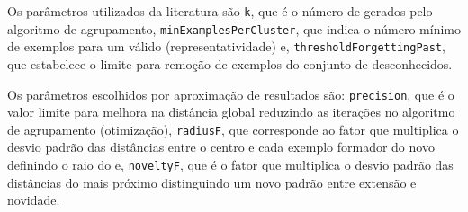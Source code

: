 Os parâmetros utilizados da literatura são
\texttt{k}, que é o número de \mclusters gerados pelo algoritmo de agrupamento,
\texttt{minExamplesPerCluster}, que indica o número mínimo de exemplos para um
\mcluster válido (representatividade) e,
\texttt{thresholdForgettingPast}, que estabelece o limite para remoção de exemplos do conjunto de
desconhecidos.

Os parâmetros escolhidos por aproximação de resultados são:
\texttt{precision}, que é o valor limite para melhora na distância global reduzindo as 
iterações no algoritmo de agrupamento (otimização),
\texttt{radiusF}, que corresponde ao fator que multiplica o desvio padrão das distâncias entre o
centro e cada exemplo formador do novo \mcluster definindo o raio do \mcluster
e,
\texttt{noveltyF}, que é o fator que multiplica o desvio padrão das distâncias do
\mcluster mais próximo distinguindo um novo padrão entre extensão e novidade.






